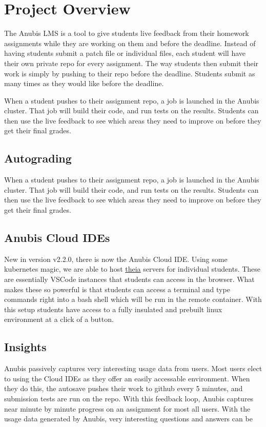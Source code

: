 \chapter{Project Overview}\label{ch:overview}

The Anubis LMS is a tool to give students live feedback from their homework
assignments while they are working on them and before the deadline.
Instead of having students submit a patch file or individual files, each student
will have their own private repo for every assignment.
The way students then submit their work is simply by pushing to their repo before
the deadline.
Students submit as many times as they would like before the deadline.

When a student pushes to their assignment repo, a job is launched in the Anubis cluster.
That job will build their code, and run tests on the results.
Students can then use the live feedback to see which areas they need to improve on
before they get their final grades.

\section{Autograding}\label{sec:autograding}

When a student pushes to their assignment repo, a job is launched in the
Anubis cluster. That job will build their code, and run tests on the results.
Students can then use the live feedback to see which areas they need to improve on
before they get their final grades.


\section{Anubis Cloud IDEs}\label{sec:anubis-cloud-ides}

New in version v2.2.0, there is now the Anubis Cloud IDE. Using some kubernetes magic, we are able to
host \href{https://theia-ide.org/}{theia} servers for individual students. These are essentially VSCode instances
that students can access in the browser. What makes these so powerful is that students can access a terminal
and type commands right into a bash shell which will be run in the remote container. With this setup students
have access to a fully insulated and prebuilt linux environment at a click of a button.


\section{Insights}\label{sec:insights}

Anubis passively captures very interesting usage data from users.
Most users elect to using the Cloud IDEs as they offer an easily accessable environment.
When they do this, the autosave pushes their work to github every 5 minutes, and
submission tests are run on the repo.
With this feedback loop, Anubis captures near minute by minute progress on an assignment
for most all users.
With the usage data generated by Anubis, very interesting questions and answers can be
